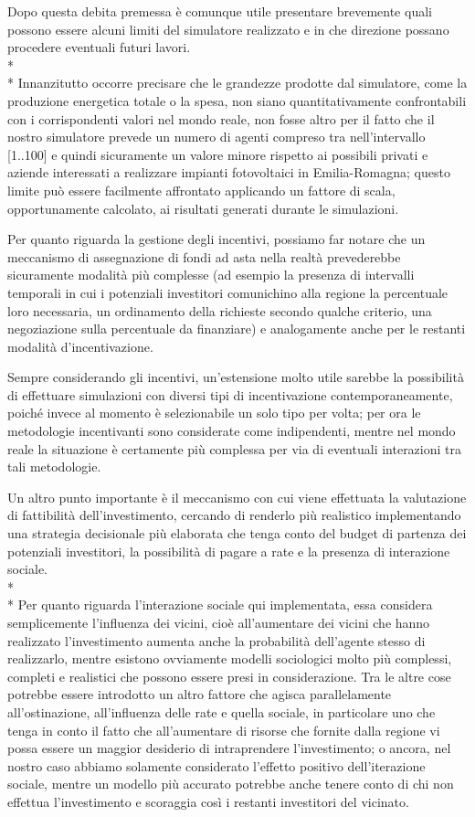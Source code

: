 Dopo questa debita premessa è comunque utile presentare brevemente quali possono essere alcuni limiti del simulatore realizzato e in che direzione possano procedere eventuali futuri lavori.\\* \\*
Innanzitutto occorre precisare che le grandezze prodotte dal simulatore, come la produzione energetica totale o la spesa, non siano quantitativamente confrontabili con i corrispondenti valori nel mondo reale, non fosse altro per il fatto che il nostro simulatore prevede un numero di agenti compreso tra nell'intervallo [1..100] e quindi sicuramente un valore minore rispetto ai possibili privati e aziende interessati a realizzare impianti fotovoltaici in Emilia-Romagna; questo limite può essere facilmente affrontato applicando un fattore di scala, opportunamente calcolato, ai risultati generati durante le simulazioni.

Per quanto riguarda la gestione degli incentivi, possiamo far notare che un meccanismo di assegnazione di fondi ad asta nella realtà prevederebbe sicuramente modalità più complesse (ad esempio la presenza di intervalli temporali in cui i potenziali investitori comunichino alla regione la percentuale loro necessaria, un ordinamento della richieste secondo qualche criterio, una negoziazione sulla percentuale da finanziare) e analogamente anche per le restanti modalità d'incentivazione.

Sempre considerando gli incentivi, un'estensione molto utile sarebbe la possibilità di effettuare simulazioni con diversi tipi di incentivazione contemporaneamente, poiché invece al momento è selezionabile un solo tipo per volta; per ora le metodologie incentivanti sono considerate come indipendenti, mentre nel mondo reale la situazione è certamente più complessa per via di eventuali interazioni tra tali metodologie.

Un altro punto importante è il meccanismo con cui viene effettuata la valutazione di fattibilità dell'investimento, cercando di renderlo più realistico implementando una strategia decisionale più elaborata che tenga conto del budget di partenza dei potenziali investitori, la possibilità di pagare a rate e la presenza di interazione sociale.
\\* \\*
Per quanto riguarda l'interazione sociale qui implementata, essa considera semplicemente l’influenza dei vicini, cioè
all’aumentare dei vicini che hanno realizzato l’investimento aumenta anche la probabilità dell’agente stesso di realizzarlo, mentre esistono ovviamente modelli sociologici molto più complessi, completi e realistici che possono essere presi in considerazione. Tra le altre cose potrebbe essere introdotto un altro fattore che agisca parallelamente all'ostinazione, all'influenza delle rate e quella sociale, in particolare uno che tenga in conto il fatto che all’aumentare di risorse che fornite dalla regione vi possa essere un maggior desiderio di intraprendere l’investimento; o ancora, nel nostro caso abbiamo solamente considerato l'effetto positivo dell'iterazione sociale, mentre un modello più accurato potrebbe anche tenere conto di chi non effettua l'investimento e scoraggia così i restanti investitori del vicinato.

%
%

%
